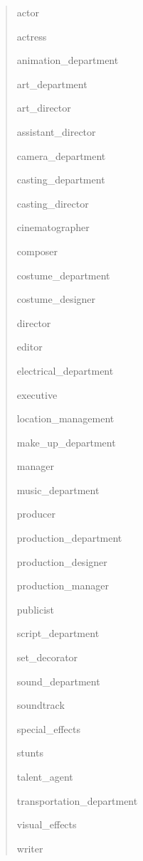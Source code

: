 \documentclass[epsfig,a4paper,11pt,titlepage,twoside,openany]{book}
\begin{document}
\begin{quote}
    \begin{itemize*}
    \item actor
    \item actress
    \item animation\_department
    \item art\_department
    \item art\_director
    \item assistant\_director
    \item camera\_department
    \item casting\_department
    \item casting\_director
    \item cinematographer
    \item composer
    \item costume\_department
    \item costume\_designer
    \item director
    \item editor
    \item electrical\_department
    \item executive
    \item location\_management
    \item make\_up\_department
    \item manager
    \item music\_department
    \item producer
    \item production\_department
    \item production\_designer
    \item production\_manager
    \item publicist
    \item script\_department
    \item set\_decorator
    \item sound\_department
    \item soundtrack
    \item special\_effects
    \item stunts
    \item talent\_agent
    \item transportation\_department
    \item visual\_effects
    \item writer
    \end{itemize*}
\end{quote}
\end{document}
